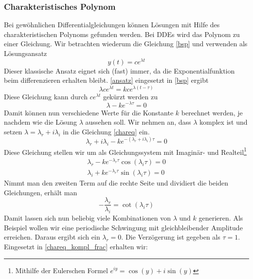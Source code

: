 \subsubsection{Charakteristisches Polynom}
Bei gewöhnlichen Differentialgleichungen können Lösungen mit Hilfe des charakteristischen Polynoms gefunden werden. 
Bei DDEs wird das Polynom zu einer Gleichung. 
Wir betrachten wiederum die Gleichung \ref{bsp} und verwenden als Lösungsansatz
\begin{equation}\label{ansatz}
	y(t) = ce^{\lambda t}
\end{equation}
Dieser klassische Ansatz eignet sich (fast) immer, da die Exponentialfunktion beim differenzieren erhalten bleibt. 
\eqref{ansatz} eingesetzt in \eqref{bsp} ergibt
\begin{equation}
	\lambda ce^{\lambda t} = kce^{\lambda (t-\tau )}
\end{equation} 
Diese Gleichung kann durch $ce^{\lambda t}$ gekürzt werden zu
\begin{equation}\label{chareq}
	\lambda  - ke^{-\lambda \tau}= 0
\end{equation} 
Damit können nun verschiedene Werte für die Konstante $k$ berechnet werden, je nachdem wie die Lösung $\lambda$ aussehen soll.
Wir nehmen an, dass $\lambda$ komplex ist und setzen $\lambda = \lambda_r + i\lambda_i$ in die Gleichung \eqref{chareq} ein.
\begin{equation}\label{chareq_kompl}
	\lambda_r + i\lambda_i  - ke^{-(\lambda_r + i\lambda_i) \tau}= 0
\end{equation} 
Diese Gleichung stellen wir um als Gleichungssystem mit Imaginär- und Realteil\footnote{Mithilfe der Eulerschen Formel $e^{iy}=\cos(y)+i\sin(y)$}
\begin{align}
	\lambda_r - ke^{-\lambda_r\tau}\cos(\lambda_i\tau)=0 \label{realchar} \\
	\lambda_i + ke^{-\lambda_r\tau}\sin(\lambda_i\tau)=0 \label{imagchar}
\end{align}
Nimmt man den zweiten Term auf die rechte Seite und dividiert die beiden Gleichungen, erhält man
\begin{equation} \label{chareq_kompl_frac}
	-\frac{\lambda_r}{\lambda_i} = \cot(\lambda_i\tau)
\end{equation}
Damit lassen sich nun beliebig viele Kombinationen von $\lambda$ und $k$ generieren.
Als Beispiel wollen wir eine periodische Schwingung mit gleichbleibender Amplitude erreichen.
Daraus ergibt sich ein $\lambda_r = 0$. 
Die Verzögerung ist gegeben als $\tau = 1$.
Eingesetzt in \eqref{chareq_kompl_frac} erhalten wir:
